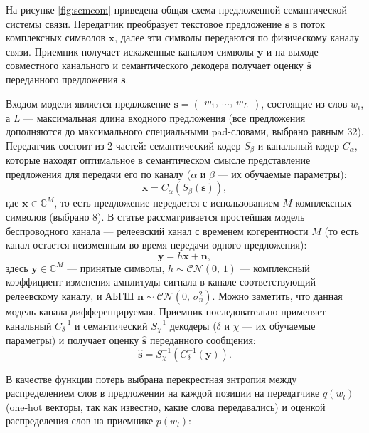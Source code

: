 \documentclass[a4paper,12pt]{article}
\begin{document}
	На рисунке \ref{fig:semcom} приведена общая схема предложенной семантической системы связи. Передатчик преобразует текстовое предложение $\mathbf{s}$ в поток комплексных символов $\mathbf{x}$, далее эти символы передаются по физическому каналу связи. Приемник получает искаженные каналом символы $\mathbf{y}$ и на выходе совместного канального и семантического декодера получает оценку $\hat{\mathbf{s}}$ переданного предложения $\mathbf{s}$. 
	
	Входом модели является предложение $\mathbf{s} = \begin{pmatrix} w_1,\,...,\,w_L \end{pmatrix}$, состоящие из слов $w_i$, а $L$ --- максимальная длина входного предложения (все предложения дополняются до максимального специальными pad-словами, выбрано равным 32). Передатчик состоит из 2 частей: семантический кодер $S_\beta$ и канальный кодер $C_\alpha$, которые находят оптимальное в семантическом смысле представление предложения для передачи его по каналу ($\alpha$ и $\beta$ --- их обучаемые параметры):
	\begin{equation}
		\mathbf{x}=C_\alpha(S_\beta(\mathbf{s})), 
	\end{equation}
	где $\mathbf{x}\in \mathbb{C}^M$, то есть предложение передается с использованием $M$ комплексных символов (выбрано 8). В статье рассматривается простейшая модель беспроводного канала --- релеевский канал с временем когерентности $M$ (то есть канал остается неизменным во время передачи одного предложения):
	\begin{equation}
		\mathbf{y} = h \mathbf{x} + \mathbf{n},
	\end{equation}
	здесь $\mathbf{y}\in \mathbb{C}^M$ --- принятые символы, $h\sim \mathcal{CN}(0,\,1)$  --- комплексный коэффициент изменения амплитуды сигнала в канале соответствующий релеевскому каналу, и АБГШ  $\mathbf{n}\sim\mathcal{CN}(0,\,\sigma_n^2)$. Можно заметить, что данная модель канала дифференцируемая. Приемник последовательно применяет канальный $C_\delta^{-1}$ и семантический $S_\chi^{-1}$ декодеры ($\delta$ и $\chi$ --- их обучаемые параметры) и получает оценку $\hat{\mathbf{s}}$ переданного сообщения:
	\begin{equation}
		\hat{\mathbf{s}}=S_\chi^{-1}(C_\delta^{-1}(\mathbf{y})).
	\end{equation}
	
	В качестве функции потерь выбрана перекрестная энтропия между распределением слов в предложении на каждой позиции на передатчике $q(w_l)$ (one-hot векторы, так как известно, какие слова передавались) и оценкой распределения слов на приемнике $p(w_l)$:
	
\end{document}
